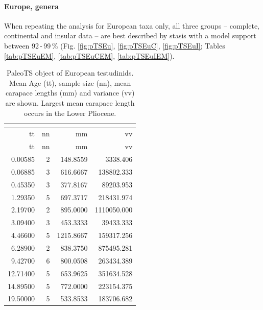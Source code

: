 \paragraph{Europe, genera}\label{europe-genera}

When repeating the analysis for European taxa only, all three groups -- complete, continental and insular data -- are best described by stasis with a model support between 92\,-\,99\,\% (Fig. \ref{fig:pTSEu}, \ref{fig:pTSEuC}, \ref{fig:pTSEuI}; Tables \ref{tab:pTSEuEM}, \ref{tab:pTSEuCEM}, \ref{tab:pTSEuIEM}).

\begin{longtable}[]{@{}rrrr@{}}
	\caption[PaleoTS object of European \T]{PaleoTS object of European testudinids. Mean Age (tt), sample size (nn), mean carapace lengths (mm) and variance (vv) are shown. Largest mean carapace length occurs in the Lower Pliocene.}
	\label{tab:pTSEu}\tabularnewline
	\toprule
	tt & nn & mm & vv\tabularnewline
	\midrule
	\endfirsthead
	\toprule
	tt & nn & mm & vv\tabularnewline
	\midrule
	\endhead
	0.00585 & 2 & 148.8559 & 3338.406\tabularnewline
	0.06885 & 3 & 616.6667 & 138802.333\tabularnewline
	0.45350 & 3 & 377.8167 & 89203.953\tabularnewline
	1.29350 & 5 & 697.3717 & 218431.974\tabularnewline
	2.19700 & 2 & 895.0000 & 1110050.000\tabularnewline
	3.09400 & 3 & 453.3333 & 39433.333\tabularnewline
	4.46600 & 5 & 1215.8667 & 159317.256\tabularnewline
	6.28900 & 2 & 838.3750 & 875495.281\tabularnewline
	9.42700 & 6 & 800.0508 & 263434.389\tabularnewline
	12.71400 & 5 & 653.9625 & 351634.528\tabularnewline
	14.89500 & 5 & 772.0000 & 223154.375\tabularnewline
	19.50000 & 5 & 533.8533 & 183706.682\tabularnewline
	\bottomrule
\end{longtable}


